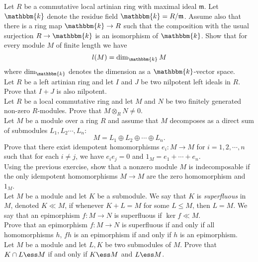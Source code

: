 \prob Let $R$ be a commutative local artinian ring with maximal ideal $\mathfrak{m}$. Let $\mathbbm{k}$ denote the residue field $\mathbbm{k}=R/\mathfrak{m}$. Assume also that there is a ring map $\mathbbm{k} \rightarrow R$ such that the composition with the usual surjection $R \rightarrow \mathbbm{k}$ is an isomorphism of $\mathbbm{k}$. Show that for every module $M$ of finite length we have
	\[ l(M)=\dim_\mathbbm{k} M \]
where $\dim_\mathbbm{k}$ denotes the dimension as a $\mathbbm{k}$-vector space. \\


\prob Let $R$ be a left artinian ring and let $I$ and $J$ be two nilpotent left ideals in $R$. Prove that $I+J$ is also nilpotent. \\


\prob Let $R$ be a local commutative ring and let $M$ and $N$ be two finitely generated non-zero $R$-modules. Prove that $M \otimes_R N \neq 0$. \\


\prob Let $M$ be a module over a ring $R$ and assume that $M$ decomposes as a direct sum of submodules $L_1,L_2 \cdots, L_n$:
	\[ M=L_1 \oplus L_2 \oplus \cdots \oplus L_n. \] 
Prove that there exist idempotent homomorphisms $e_i: M \rightarrow M$ for $i=1,2,\cdots,n$ such that for each $i \neq j$, we have $e_i e_j=0$ and $1_M=e_1+\cdots+e_n$. \\


\prob Using the previous exercise, show that a nonzero module $M$ is indecomposable if the only idempotent homomorphisms $M \rightarrow M$ are the zero homomorphism and $1_M$. \\


\prob Let $M$ be a module and let $K$ be a submodule. We say that $K$ is \emph{superfluous} in $M$, denoted $K \ll M$, if whenever $K+L=M$ for some $L \leq M$, then $L=M$. We say that an epimorphism $f: M \rightarrow N$ is superfluous if $\ker f \ll M$. \\


Prove that an epimorphism $f: M \rightarrow N$ is superfluous if and only if all homomorphisms $h$, $fh$ is an epimorphism if and only if $h$ is an epimorphism. \\


\prob Let $M$ be a module and let $L,K$ be two submodules of $M$. Prove that $K \cap L \ess M$ if and only if $K \ess M$ and $L \ess M$. \\

